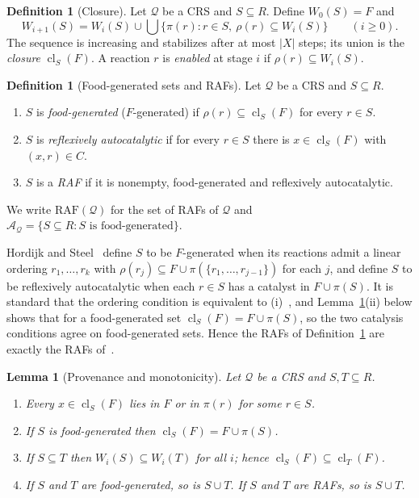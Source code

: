\documentclass[11pt,a4paper]{article}
\theoremstyle{plain}
\newtheorem{lemma}[theorem]{Lemma}
\theoremstyle{definition}
\newtheorem{definition}[theorem]{Definition}
\theoremstyle{remark}
\newcommand{\cl}{\operatorname{cl}}
\newcommand{\RAF}{\mathrm{RAF}}
\newcommand{\cA}{\mathcal{A}}
\newcommand{\cQ}{\mathcal{Q}}
\begin{document}
\begin{definition}[Closure]\label{def:closure}
Let $\cQ$ be a CRS and $S\subseteq R$. Define $W_0(S)=F$ and
\[
W_{i+1}(S)=W_i(S)\cup\bigcup\{\pi(r): r\in S,\ \rho(r)\subseteq W_i(S)\}\qquad(i\ge 0).
\]
The sequence is increasing and stabilizes after at most $|X|$ steps; its union is the \emph{closure} $\cl_S(F)$. A reaction $r$ is \emph{enabled} at stage $i$ if $\rho(r)\subseteq W_i(S)$.
\end{definition}

\begin{definition}[Food-generated sets and RAFs]\label{def:raf}
Let $\cQ$ be a CRS and $S\subseteq R$.
\begin{enumerate}[label=(\roman*)]
\item $S$ is \emph{food-generated} ($F$-generated) if $\rho(r)\subseteq\cl_S(F)$ for every $r\in S$.
\item $S$ is \emph{reflexively autocatalytic} if for every $r\in S$ there is $x\in\cl_S(F)$ with $(x,r)\in C$.
\item $S$ is a \emph{RAF} if it is nonempty, food-generated and reflexively autocatalytic.
\end{enumerate}
We write $\RAF(\cQ)$ for the set of RAFs of $\cQ$ and $\cA_{\cQ}=\{S\subseteq R: S\text{ is food-generated}\}$.
\end{definition}

Hordijk and Steel~\cite{hordijk2004detecting} define $S$ to be $F$-generated when its reactions admit a linear ordering $r_1,\dots,r_k$ with $\rho(r_j)\subseteq F\cup\pi(\{r_1,\dots,r_{j-1}\})$ for each $j$, and define $S$ to be reflexively autocatalytic when each $r\in S$ has a catalyst in $F\cup\pi(S)$. It is standard that the ordering condition is equivalent to (i)~\cite[Section~3.1]{steel2023interior}, and Lemma~\ref{lem:provenance}(ii) below shows that for a food-generated set $\cl_S(F)=F\cup\pi(S)$, so the two catalysis conditions agree on food-generated sets. Hence the RAFs of Definition~\ref{def:raf} are exactly the RAFs of~\cite{hordijk2004detecting,steel2023interior}.

\begin{lemma}[Provenance and monotonicity]\label{lem:provenance}
Let $\cQ$ be a CRS and $S,T\subseteq R$.
\begin{enumerate}[label=(\roman*)]
\item Every $x\in\cl_S(F)$ lies in $F$ or in $\pi(r)$ for some $r\in S$.
\item If $S$ is food-generated then $\cl_S(F)=F\cup\pi(S)$.
\item If $S\subseteq T$ then $W_i(S)\subseteq W_i(T)$ for all $i$; hence $\cl_S(F)\subseteq\cl_T(F)$.
\item If $S$ and $T$ are food-generated, so is $S\cup T$. If $S$ and $T$ are RAFs, so is $S\cup T$.
\end{enumerate}
\end{lemma}
\end{document}
